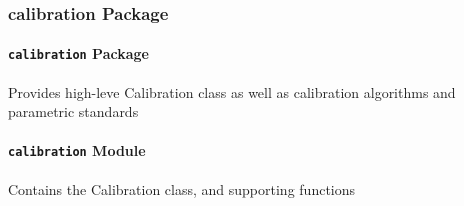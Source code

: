 \documentclass[letterpaper,10pt,english]{sphinxmanual}
\begin{document}
\subsubsection{calibration Package}
\label{api/mwavepy.calibration:calibration-package}\label{api/mwavepy.calibration::doc}

\paragraph{\texttt{calibration} Package}
\label{api/mwavepy.calibration:id1}\label{api/mwavepy.calibration:module-mwavepy.calibration}
Provides high-leve Calibration class as well as calibration algorithms
and parametric standards


\paragraph{\texttt{calibration} Module}
\label{api/mwavepy.calibration:module-mwavepy.calibration.calibration}\label{api/mwavepy.calibration:calibration-module}
Contains the Calibration class, and supporting functions
\end{document}
